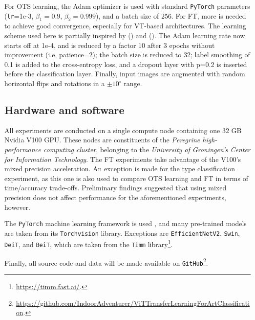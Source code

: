 For OTS learning, the Adam optimizer \citep{kingma2014adam} is used with standard \texttt{PyTorch} parameters (\texttt{lr}=1e-3, $\beta_1=0.9$, $\beta_2=0.999$), and a batch size of 256. For FT, more is needed to achieve good convergence, especially for VT-based architectures. The learning scheme used here is partially inspired by \citeauthor{matsoukas2021time} (\citeyear{matsoukas2021time}) and \citeauthor{zhou2021convnets} (\citeyear{zhou2021convnets}). The Adam learning rate now starts off at 1e-4, and is reduced by a factor 10 after 3 epochs without improvement (i.e. patience=2); the batch size is reduced to 32; label smoothing of 0.1 is added to the cross-entropy loss, and a dropout layer with p=0.2 is inserted before the classification layer. Finally, input images are augmented with random horizontal flips and rotations in a $\pm 10 ^\circ$ range.

\subsection{Hardware and software}
All experiments are conducted on a single compute node containing one 32 GB Nvidia V100 GPU. These nodes are constituents of the \textit{Peregrine high-performance computing cluster}, belonging to the \textit{University of Groningen's Center for Information Technology}. The FT experiments take advantage of the V100's mixed precision acceleration. An exception is made for the type classification experiment, as this one is also used to compare OTS learning and FT in terms of time/accuracy trade-offs. Preliminary findings suggested that using mixed precision does not affect performance for the aforementioned experiments, however.

The \texttt{PyTorch} machine learning framework is used \citep{paszke2019pytorch}, and many pre-trained models are taken from its \texttt{Torchvision} library. Exceptions are \texttt{EfficientNetV2}, \texttt{Swin}, \texttt{DeiT}, and \texttt{BeiT}, which are taken from the \texttt{Timm} library\footnote{\url{https://timm.fast.ai/}.}.

Finally, all source code and data will be made available on \texttt{GitHub}\footnote{\url{https://github.com/IndoorAdventurer/ViTTransferLearningForArtClassification}.}.

